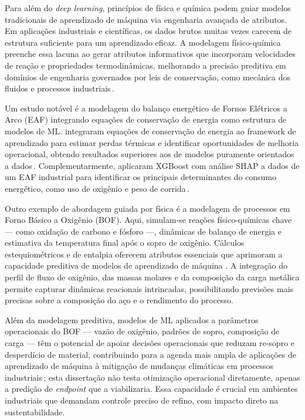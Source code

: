 Para além do \textit{deep learning}, princípios de física e química podem guiar modelos tradicionais de aprendizado de máquina via engenharia avançada de atributos. Em aplicações industriais e científicas, os dados brutos muitas vezes carecem de estrutura suficiente para um aprendizado eficaz. A modelagem físico-química preenche essa lacuna ao gerar atributos informativos que incorporam velocidades de reação e propriedades termodinâmicas, melhorando a precisão preditiva em domínios de engenharia governados por leis de conservação, como mecânica dos fluidos e processos industriais\,\cite{brunton2020machine,willard2020integrating}.

Um estudo notável é a modelagem do balanço energético de Fornos Elétricos a Arco (EAF) integrando equações de conservação de energia como estrutura de modelos de ML. \citeauthor{logar2022eaf} integraram equações de conservação de energia ao framework de aprendizado para estimar perdas térmicas e identificar oportunidades de melhoria operacional, obtendo resultados superiores aos de modelos puramente orientados a dados\,\cite{logar2022eaf}. Complementarmente, \citeauthor{manojlovic2022eaf} aplicaram XGBoost com análise SHAP a dados de um EAF industrial para identificar os principais determinantes do consumo energético, como uso de oxigênio e peso de corrida\,\cite{manojlovic2022eaf}.

Outro exemplo de abordagem guiada por física é a modelagem de processos em Forno Básico a Oxigênio (BOF). Aqui, simulam-se reações físico-químicas chave — como oxidação de carbono e fósforo —, dinâmicas de balanço de energia e estimativa da temperatura final após o sopro de oxigênio. Cálculos estequiométricos e de entalpia oferecem atributos essenciais que aprimoram a capacidade preditiva de modelos de aprendizado de máquina \cite{xia2024dmpinn,bae2020bof,chattopadhyay2022hybrid}. A integração do perfil de fluxo de oxigênio, das massas molares e da composição da carga metálica permite capturar dinâmicas reacionais intrincadas, possibilitando previsões mais precisas sobre a composição do aço e o rendimento do processo.

Além da modelagem preditiva, modelos de ML aplicados a parâmetros operacionais do BOF --- vazão de oxigênio, padrões de sopro, composição de carga --- têm o potencial de apoiar decisões operacionais que reduzam re-sopro e desperdício de material, contribuindo para a agenda mais ampla de aplicações de aprendizado de máquina à mitigação de mudanças climáticas em processos industriais\,\cite{rolnick2019climate}; esta dissertação não testa otimização operacional diretamente, apenas a predição de \textit{endpoint} que a viabilizaria. Essa capacidade é crucial em ambientes industriais que demandam controle preciso de refino, com impacto direto na sustentabilidade.

